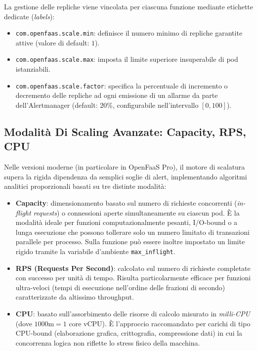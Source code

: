 \documentclass[11pt, a4paper]{article}
\begin{document}
La gestione delle repliche viene vincolata per ciascuna funzione mediante etichette dedicate (\emph{labels}):
\begin{itemize}[noitemsep]
    \item \texttt{com.openfaas.scale.min}: definisce il numero minimo di repliche garantite attive (valore di default: $1$).
    \item \texttt{com.openfaas.scale.max}: imposta il limite superiore insuperabile di pod istanziabili.
    \item \texttt{com.openfaas.scale.factor}: specifica la percentuale di incremento o decremento delle repliche ad ogni emissione di un allarme da parte dell'Alertmanager (default: $20\%$, configurabile nell'intervallo $[0, 100]$).
\end{itemize}

\subsection{Modalità Di Scaling Avanzate: Capacity, RPS, CPU}
Nelle versioni moderne (in particolare in OpenFaaS Pro), il motore di scalatura supera la rigida dipendenza da semplici soglie di alert, implementando algoritmi analitici proporzionali basati su tre distinte modalità:

\begin{itemize}
    \item \textbf{Capacity}: dimensionamento basato sul numero di richieste concorrenti (\emph{in-flight requests}) o connessioni aperte simultaneamente su ciascun pod. È la modalità ideale per funzioni computazionalmente pesanti, I/O-bound o a lunga esecuzione che possono tollerare solo un numero limitato di transazioni parallele per processo. Sulla funzione può essere inoltre impostato un limite rigido tramite la variabile d'ambiente \texttt{max\_inflight}.
    \item \textbf{RPS (Requests Per Second)}: calcolato sul numero di richieste completate con successo per unità di tempo. Risulta particolarmente efficace per funzioni ultra-veloci (tempi di esecuzione nell'ordine delle frazioni di secondo) caratterizzate da altissimo throughput.
    \item \textbf{CPU}: basato sull'assorbimento delle risorse di calcolo misurato in \emph{milli-CPU} (dove $1000\text{m} = 1\text{ core vCPU}$). È l'approccio raccomandato per carichi di tipo CPU-bound (elaborazione grafica, crittografia, compressione dati) in cui la concorrenza logica non riflette lo stress fisico della macchina.
\end{itemize}
\end{document}

